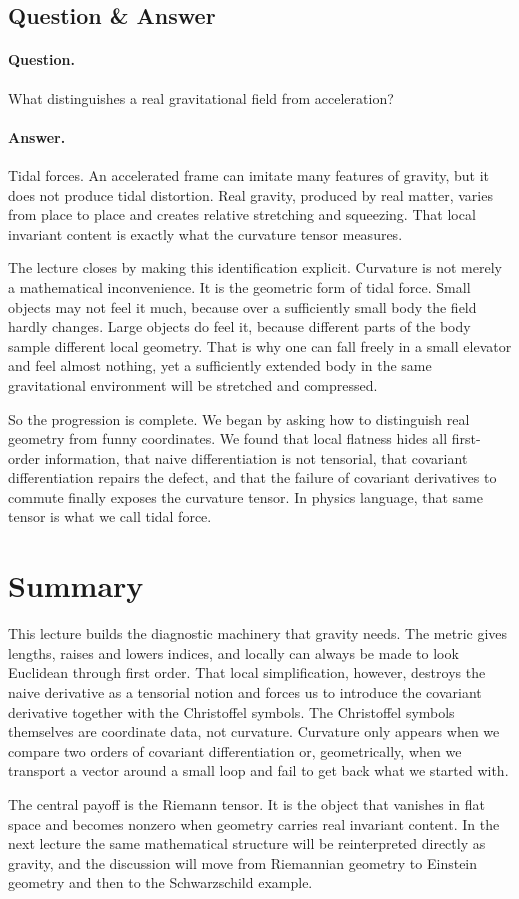 \subsection{Question \& Answer}

\paragraph{Question.} What distinguishes a real gravitational field from acceleration?

\paragraph{Answer.} Tidal forces. An accelerated frame can imitate many features of gravity, but it does not produce tidal distortion. Real gravity, produced by real matter, varies from place to place and creates relative stretching and squeezing. That local invariant content is exactly what the curvature tensor measures.

The lecture closes by making this identification explicit. Curvature is not merely a mathematical inconvenience. It is the geometric form of tidal force. Small objects may not feel it much, because over a sufficiently small body the field hardly changes. Large objects do feel it, because different parts of the body sample different local geometry. That is why one can fall freely in a small elevator and feel almost nothing, yet a sufficiently extended body in the same gravitational environment will be stretched and compressed.

So the progression is complete. We began by asking how to distinguish real geometry from funny coordinates. We found that local flatness hides all first-order information, that naive differentiation is not tensorial, that covariant differentiation repairs the defect, and that the failure of covariant derivatives to commute finally exposes the curvature tensor. In physics language, that same tensor is what we call tidal force.

\section{Summary}

This lecture builds the diagnostic machinery that gravity needs. The metric gives lengths, raises and lowers indices, and locally can always be made to look Euclidean through first order. That local simplification, however, destroys the naive derivative as a tensorial notion and forces us to introduce the covariant derivative together with the Christoffel symbols. The Christoffel symbols themselves are coordinate data, not curvature. Curvature only appears when we compare two orders of covariant differentiation or, geometrically, when we transport a vector around a small loop and fail to get back what we started with.

The central payoff is the Riemann tensor. It is the object that vanishes in flat space and becomes nonzero when geometry carries real invariant content. In the next lecture the same mathematical structure will be reinterpreted directly as gravity, and the discussion will move from Riemannian geometry to Einstein geometry and then to the Schwarzschild example.